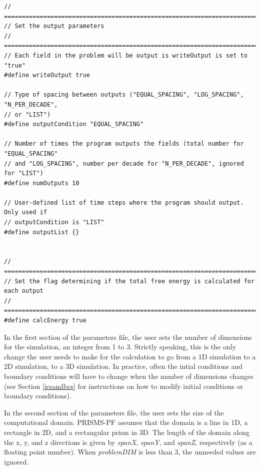 \documentclass[10pt]{article} %
\begin{document}
\begin{lstlisting}
// =================================================================================
// Set the output parameters
// =================================================================================
// Each field in the problem will be output is writeOutput is set to "true"
#define writeOutput true

// Type of spacing between outputs ("EQUAL_SPACING", "LOG_SPACING", "N_PER_DECADE",
// or "LIST")
#define outputCondition "EQUAL_SPACING"

// Number of times the program outputs the fields (total number for "EQUAL_SPACING"
// and "LOG_SPACING", number per decade for "N_PER_DECADE", ignored for "LIST")
#define numOutputs 10

// User-defined list of time steps where the program should output. Only used if
// outputCondition is "LIST"
#define outputList {}


// =================================================================================
// Set the flag determining if the total free energy is calculated for each output
// =================================================================================
#define calcEnergy true
\end{lstlisting}
\normalsize

In the first section of the parameters file, the user sets the number of dimensions for the simulation, an integer from 1 to 3. Strictly speaking, this is the only change the user needs to make for the calculation to go from a 1D simulation to a 2D simulation, to a 3D simulation. In practice, often the intial conditions and boundary conditions will have to change when the number of dimensions changes (see Section \ref{icsandbcs} for instructions on how to modify initial conditions or boundary conditions).

In the second section of the parameters file, the user sets the size of the computational domain. PRISMS-PF assumes that the domain is a line in 1D, a rectangle in 2D, and a rectangular prism in 3D. The length of the domain along the x, y, and z directions is given by \emph{spanX}, \emph{spanY}, and \emph{spanZ}, respectively (as a floating point number). When \emph{problemDIM} is less than 3, the unneeded values are ignored.
\end{document}
